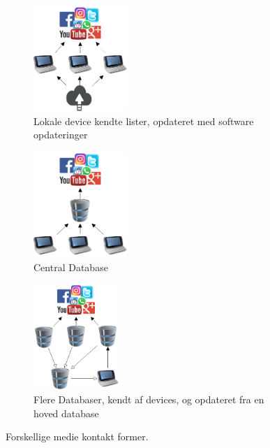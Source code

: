 \begin{figure}[H]
    \begin{subfigure}{0.33\textwidth}
        \centering
        \includegraphics[width=0.7\linewidth, height=4cm]{Projectdoc/Assets/Illustrationer/Device_Opdate.png} 
        \caption{Lokale device kendte lister, opdateret med software opdateringer}
        \label{fig:DeviceOpdate}
    \end{subfigure}
    \begin{subfigure}{0.33\textwidth}
        \centering
        \includegraphics[width=0.7\linewidth, height=4cm]{Projectdoc/Assets/Illustrationer/CentralDatabase.png}
        \caption{Central Database}
        \label{fig:CentralDatabaseList}
    \end{subfigure}
    \begin{subfigure}{0.33\textwidth}
        \centering
        \includegraphics[width=0.7\linewidth, height=4cm]{Projectdoc/Assets/Illustrationer/MainDomainServer.png}
        \caption{Flere Databaser, kendt af devices, og opdateret fra en hoved database}
        \label{fig:MainDomain}
    \end{subfigure}
    \caption{Forskellige medie kontakt former.}
    \label{fig:MedieContact}
\end{figure}

